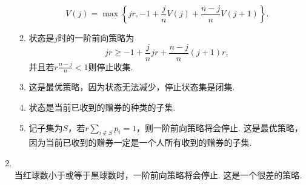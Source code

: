 \begin{enumerate}[label=\arabic{section}.\arabic*]
\begin{enumerate}[label=\alph*)]
        \[V(j)=\max\left\{jr,-1+\frac{j}{n}V(j)+\frac{n-j}{n}V(j+1)\right\}.\]
        \item 状态是$j$时的一阶前向策略为
        \[jr \geq -1+\frac{j}{n}jr+\frac{n-j}{n}(j+1)r,\]
        并且若$\displaystyle r\frac{n-j}{n}<1$则停止收集.
        \item 这是最优策略，因为状态无法减少，停止状态集是闭集.
        \item 状态是当前已收到的赠券的种类的子集.
        \item 记子集为$S$，若$\displaystyle r\sum_{i \notin S}p_i=1$，则一阶前向策略将会停止. 这是最优策略，因为当前已收到的赠券一定是一个人所有收到的赠券的子集.
    \end{enumerate}
    \item \sol\\
    当红球数小于或等于黑球数时，一阶前向策略将会停止. 这是一个很差的策略.
\end{enumerate}
\clearpage
